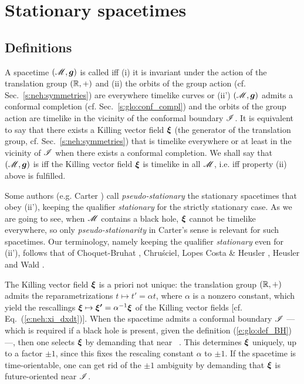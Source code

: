 \section{Stationary spacetimes} \label{s:sta:sta_st}

\subsection{Definitions} \label{s:sta:def_station}

\begin{greybox}
A spacetime $(\mathscr{M},\bm{g})$ is called 
iff (i) it is invariant under
the action of the translation group $(\mathbb{R},+)$ and (ii) the orbits of
the group action (cf. Sec.~\ref{s:neh:symmetries})
are everywhere timelike curves or (ii') $(\mathscr{M},\bm{g})$
admits a conformal completion (cf. Sec.~\ref{s:glo:conf_compl})
and the orbits of the group action are timelike in the vicinity of
the conformal boundary $\mathscr{I}$.
It is equivalent to say that there exists a Killing vector field
$\bm{\xi}$ (the generator of the translation group, cf. Sec.~\ref{s:neh:symmetries}) that is
timelike everywhere or at least in the vicinity of $\mathscr{I}$ when there exists a conformal
completion. We shall say that $(\mathscr{M},\bm{g})$ is  iff the Killing vector field $\bm{\xi}$ is timelike in all $\mathscr{M}$,
i.e. iff property (ii) above is fulfilled.
\end{greybox}

\begin{remark} \label{r:sta:pseudo-stationary}
Some authors (e.g. Carter \cite{Carte73b}) call
\emph{pseudo-stationary} the stationary spacetimes
that obey (ii'), keeping the qualifier
\emph{stationary} for the strictly stationary case.
As we are going to see, when $\mathscr{M}$
contains a black hole, $\bm{\xi}$ cannot be timelike everywhere,
so only \emph{pseudo-stationarity} in Carter's sense is relevant for such spacetimes.
Our terminology, namely keeping the qualifier \emph{stationary} even for (ii'),  follows that of
Choquet-Bruhat \cite{Choqu09},
Chru\'sciel, Lopes Costa \& Heusler \cite{ChrusLH12},
Heusler \cite{Heusl96}
and Wald \cite{Wald01}.
\end{remark}

The Killing vector field $\bm{\xi}$ is a priori not unique: the translation group $(\mathbb{R},+)$
admits the reparametrizations
$t\mapsto t' = \alpha t$, where $\alpha$ is a nonzero constant, which yield
the rescallings $\bm{\xi} \mapsto \bm{\xi'} = \alpha^{-1} \bm{\xi}$
of the Killing vector fields [cf. Eq.~(\ref{e:neh:xi_dxdt})]. When the
spacetime admits a conformal boundary $\mathscr{I}$ --- which is required if a black hole
is present, given the definition (\ref{e:glo:def_BH}) ---, then
one selects $\bm{\xi}$ by demanding that
\be \label{e:sta:xi_scri}
    \w{\xi}\cdot\w{\xi}  \quad \mbox{near\ } \scri .
\ee
This determines $\bm{\xi}$ uniquely, up to a factor $\pm 1$, since this fixes
the rescaling constant $\alpha$ to $\pm 1$. If the spacetime is time-orientable, one
can get rid of the $\pm 1$ ambiguity by demanding that $\bm{\xi}$
is future-oriented near $\mathscr{I}$.

